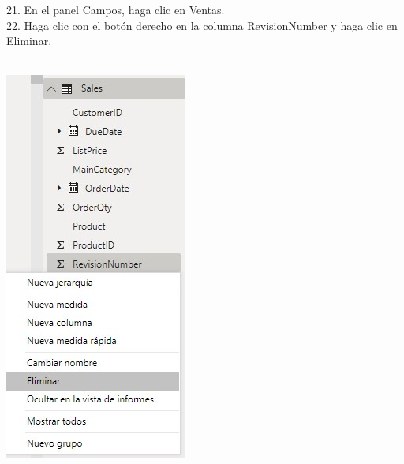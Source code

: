 \begin{flushleft}
\begin{itemize}
21. En el panel Campos, haga clic en Ventas.\\
22. Haga clic con el botón derecho en la columna RevisionNumber y haga clic en Eliminar.\\
\textbf{ }\\
\begin{center}
	\includegraphics[width=6cm]{./Imagenes/image18} 
	\end{center}
\textbf{ }\\


\end{itemize}
\end{flushleft}
